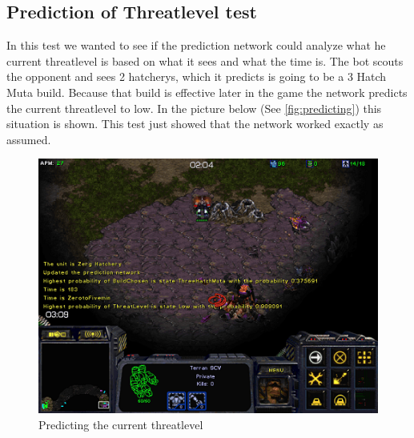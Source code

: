 	\subsection{Prediction of Threatlevel test}
		In this test we wanted to see if the prediction network could analyze what he current threatlevel is based on what it sees and what the time is.
		The bot scouts the opponent and sees 2 hatcherys, which it predicts is going to be a 3 Hatch Muta build. Because that build is effective later 
		in the game the network predicts the current threatlevel to low. In the picture below (See \ref{fig:predicting}) this situation is shown. 
		This test just showed that the network worked exactly as assumed.
		\begin{figure}[H]
			\includegraphics[scale=0.7]{Figures/BuildOrderPredictorTest/threatlevel.png}
			\caption{Predicting the current threatlevel}\label{fig:threatlevel}
		\end{figure}